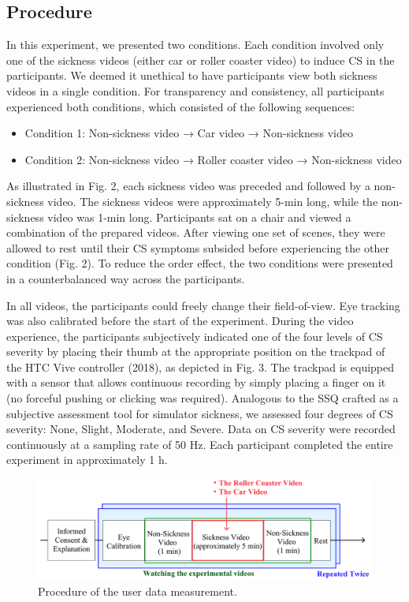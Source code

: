 \documentclass{ieeeaccess}
\begin{document}
\subsection{Procedure}
In this experiment, we presented two conditions. Each condition involved only one of the sickness videos (either car or roller coaster video) to induce CS in the participants. We deemed it unethical to have participants view both sickness videos in a single condition. For transparency and consistency, all participants experienced both conditions, which consisted of the following sequences:

\begin{itemize}
    \item Condition 1: Non-sickness video → Car video → Non-sickness video
    \item Condition 2: Non-sickness video → Roller coaster video → Non-sickness video
\end{itemize}

As illustrated in Fig. 2, each sickness video was preceded and followed by a non-sickness video. The sickness videos were approximately 5-min long, while the non-sickness video was 1-min long. Participants sat on a chair and viewed a combination of the prepared videos. After viewing one set of scenes, they were allowed to rest until their CS symptoms subsided before experiencing the other condition (Fig. 2). To reduce the order effect, the two conditions were presented in a counterbalanced way across the participants.

In all videos, the participants could freely change their field-of-view. 
Eye tracking was also calibrated before the start of the experiment.
During the video experience, the participants subjectively indicated one of the four levels of CS severity by placing their thumb at the appropriate position on the trackpad of the HTC Vive controller (2018), as depicted in Fig. 3. The trackpad is equipped with a sensor that allows continuous recording by simply placing a finger on it (no forceful pushing or clicking was required). Analogous to the SSQ crafted as a subjective assessment tool for simulator sickness, we assessed four degrees of CS severity: None, Slight, Moderate, and Severe. Data on CS severity were recorded continuously at a sampling rate of 50 Hz. Each participant completed the entire experiment in approximately 1 h.

 \begin{figure}[th]
  \begin{center}
    \includegraphics*[width=1.0\linewidth]{Procedure.png}
  \end{center}
  \caption{Procedure of the user data measurement.}
  \label{figure}
\end{figure}
\end{document}
